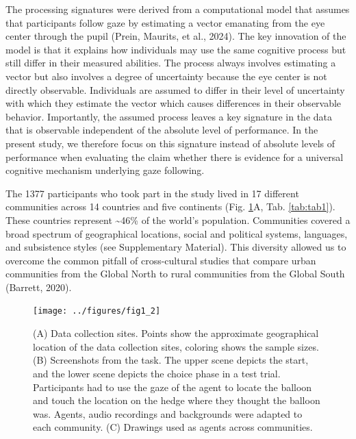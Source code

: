 \documentclass[
  man,floatsintext]{apa7}
\begin{document}
The processing signatures were derived from a computational model that assumes that participants follow gaze by estimating a vector emanating from the eye center through the pupil (Prein, Maurits, et al., 2024). The key innovation of the model is that it explains how individuals may use the same cognitive process but still differ in their measured abilities. The process always involves estimating a vector but also involves a degree of uncertainty because the eye center is not directly observable. Individuals are assumed to differ in their level of uncertainty with which they estimate the vector which causes differences in their observable behavior. Importantly, the assumed process leaves a key signature in the data that is observable independent of the absolute level of performance. In the present study, we therefore focus on this signature instead of absolute levels of performance when evaluating the claim whether there is evidence for a universal cognitive mechanism underlying gaze following.

The 1377 participants who took part in the study lived in 17 different communities across 14 countries and five continents (Fig. \ref{fig:fig1}A, Tab. \ref{tab:tab1}). These countries represent \textasciitilde46\% of the world's population. Communities covered a broad spectrum of geographical locations, social and political systems, languages, and subsistence styles (see Supplementary Material). This diversity allowed us to overcome the common pitfall of cross-cultural studies that compare urban communities from the Global North to rural communities from the Global South (Barrett, 2020).

\begin{figure}

{\centering \texttt{[image: ../figures/fig1\_2]} 

}

\caption{(A) Data collection sites. Points show the approximate geographical location of the data collection sites, coloring shows the sample sizes. (B) Screenshots from the task. The upper scene depicts the start, and the lower scene depicts the choice phase in a test trial. Participants had to use the gaze of the agent to locate the balloon and touch the location on the hedge where they thought the balloon was. Agents, audio recordings and backgrounds were adapted to each community. (C) Drawings used as agents across communities.}\label{fig:fig1}
\end{figure}
\end{document}
